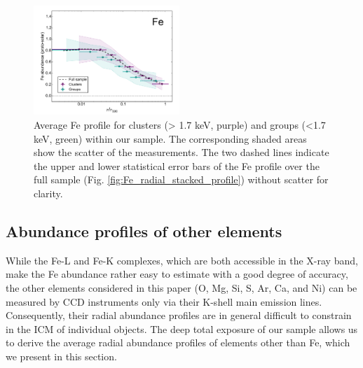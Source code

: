 \documentclass{aa}
\begin{document}
\begin{figure}[!]
        \centering
                \includegraphics[width=0.49\textwidth]{fig_radial_stacked_Fe_clgr.pdf}

        \caption{Average Fe profile for clusters (> 1.7 keV, purple) and groups (<1.7 keV, green) within our sample. The corresponding shaded areas show the scatter of the measurements. The two dashed lines indicate the upper and lower statistical error bars of the Fe profile over the full sample (Fig. \ref{fig:Fe_radial_stacked_profile}) without scatter for clarity.}
\label{fig:Fe_radial_stacked_profile_clgr}
\end{figure}















\subsection{Abundance profiles of other elements}\label{sect:results_abun}


While the Fe-L and Fe-K complexes, which are both accessible in the X-ray band, make the Fe abundance rather easy to estimate with a good degree of accuracy, the other elements considered in this paper (O, Mg, Si, S, Ar, Ca, and Ni) can be measured by CCD instruments only via their K-shell main emission lines. Consequently, their radial abundance profiles are in general difficult to constrain in the ICM of individual objects. The deep total exposure of our sample allows us to derive the average radial abundance profiles of elements other than Fe, which we present in this section.
\end{document}
